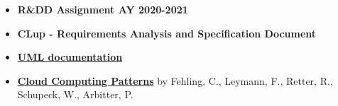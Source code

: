 \documentclass[../../main.tex]{subfiles}
\begin{document}
\begin{itemize}
  \item \textbf{R\&DD Assignment AY 2020-2021}
  \item \textbf{CLup - Requirements Analysis and Specification Document}
  \item \textbf{\href{https://www.uml-diagrams.org/}{UML documentation}}
  \item \textbf{\href{https://www.springer.com/gp/book/9783709115671}{Cloud Computing Patterns}} by Fehling, C., Leymann, F., Retter, R., Schupeck, W., Arbitter, P.
\end{itemize}
\end{document}
